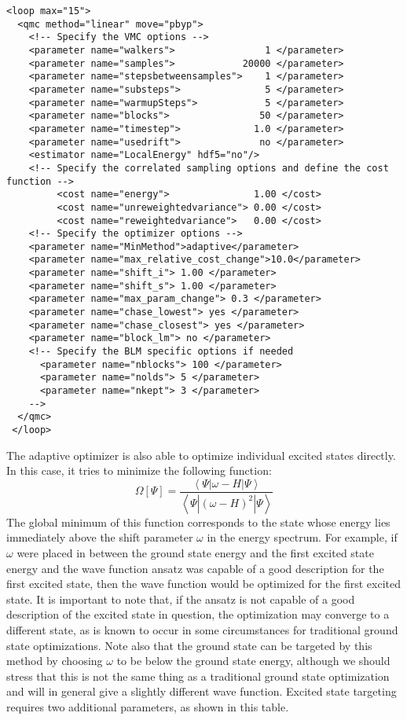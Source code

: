 \begin{lstlisting}[style=QMCPXML]
 <loop max="15">
  <qmc method="linear" move="pbyp">
    <!-- Specify the VMC options -->
    <parameter name="walkers">                1 </parameter>
    <parameter name="samples">            20000 </parameter>
    <parameter name="stepsbetweensamples">    1 </parameter>
    <parameter name="substeps">               5 </parameter>
    <parameter name="warmupSteps">            5 </parameter>
    <parameter name="blocks">                50 </parameter>
    <parameter name="timestep">             1.0 </parameter>
    <parameter name="usedrift">              no </parameter>
    <estimator name="LocalEnergy" hdf5="no"/>
    <!-- Specify the correlated sampling options and define the cost function -->
         <cost name="energy">               1.00 </cost>
         <cost name="unreweightedvariance"> 0.00 </cost>
         <cost name="reweightedvariance">   0.00 </cost>
    <!-- Specify the optimizer options -->
    <parameter name="MinMethod">adaptive</parameter>
    <parameter name="max_relative_cost_change">10.0</parameter>
    <parameter name="shift_i"> 1.00 </parameter>
    <parameter name="shift_s"> 1.00 </parameter>
    <parameter name="max_param_change"> 0.3 </parameter>
    <parameter name="chase_lowest"> yes </parameter>
    <parameter name="chase_closest"> yes </parameter>
    <parameter name="block_lm"> no </parameter>
    <!-- Specify the BLM specific options if needed
      <parameter name="nblocks"> 100 </parameter>
      <parameter name="nolds"> 5 </parameter>
      <parameter name="nkept"> 3 </parameter>
    -->
  </qmc>
 </loop>
\end{lstlisting}

The adaptive optimizer is also able to optimize individual excited states directly. \cite{Zhao:2016:dir_tar}
In this case, it tries to minimize the following function: 
\begin{equation*}
\Omega[\Psi]=\frac{\left<\Psi|\omega-H|\Psi\right>}{\left<\Psi|{\left(\omega-H\right)}^2|\Psi\right>}
\end{equation*}
The global minimum of this function corresponds to the state whose energy lies immediately above the shift parameter $\omega$ in the energy spectrum.
For example, if $\omega$ were placed in between the ground state energy and the first excited state energy and the wave function ansatz was capable of a good
description for the first excited state, then the wave function would be optimized for the first excited state.
It is important to note that, if the ansatz is not capable of a good description of the excited state in question, the optimization may converge to a different
state, as is known to occur in some circumstances for traditional ground state optimizations.
Note also that the ground state can be targeted by this method by choosing $\omega$ to be below the ground state energy, although we should stress that this
is not the same thing as a traditional ground state optimization and will in general give a slightly different wave function.
Excited state targeting requires two additional parameters, as shown in this table.


